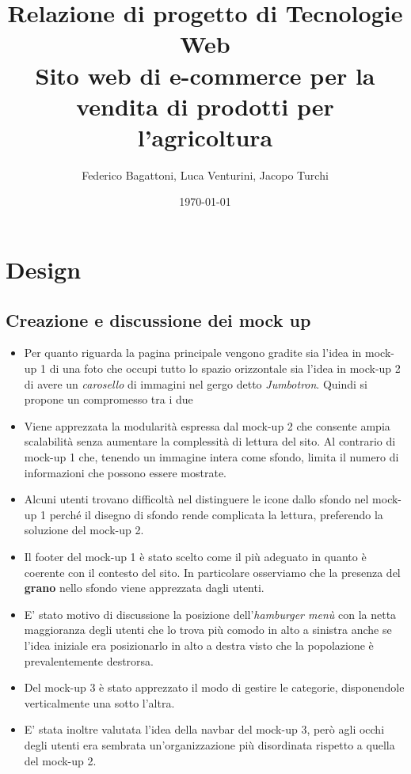 \documentclass{report}
\title{
    Relazione di progetto di Tecnologie Web\\
    \large Sito web di e-commerce per la vendita di prodotti per l'agricoltura
}
\author{Federico Bagattoni, Luca Venturini, Jacopo Turchi}
\date{\today}
\begin{document}
\maketitle

\tableofcontents

\chapter{Design}

\section{Creazione e discussione dei mock up}
\begin{itemize}
    \item {Per quanto riguarda la pagina principale vengono gradite sia l'idea in mock-up 1 di una foto che occupi tutto lo spazio orizzontale sia l'idea in mock-up 2 di avere un \textit{carosello} di immagini nel gergo detto \textit{Jumbotron}. Quindi si propone un compromesso tra i due}
    \item {Viene apprezzata la modularità espressa dal mock-up 2 che consente ampia scalabilità senza aumentare la complessità di lettura del sito. Al contrario di mock-up 1 che, tenendo un immagine intera come sfondo, limita il numero di informazioni che possono essere mostrate.}
    \item {Alcuni utenti trovano difficoltà nel distinguere le icone dallo sfondo nel mock-up 1 perché il disegno di sfondo rende complicata la lettura, preferendo la soluzione del mock-up 2.}
    \item {Il footer del mock-up 1 è stato scelto come il più adeguato in quanto è coerente con il contesto del sito. In particolare osserviamo che la presenza del \textbf{grano} nello sfondo viene apprezzata dagli utenti.}
    \item {E' stato motivo di discussione la posizione dell'\textit{hamburger menù} con la netta maggioranza degli utenti che lo trova più comodo in alto a sinistra anche se l'idea iniziale era posizionarlo in alto a destra visto che la popolazione è prevalentemente destrorsa.}
    \item {Del mock-up 3 è stato apprezzato il modo di gestire le categorie, disponendole verticalmente una sotto l'altra.}
    \item {E' stata inoltre valutata l'idea della navbar del mock-up 3, però agli occhi degli utenti era sembrata un'organizzazione più disordinata rispetto a quella del mock-up 2.}
\end{itemize}
\end{document}
